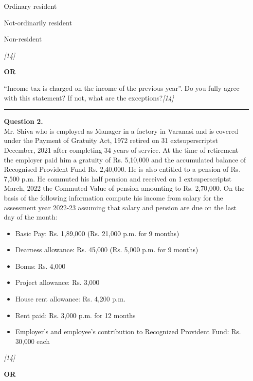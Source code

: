 \documentclass[11pt,a4paper]{article}
\newcommand{\pts}[1]{\hfill   \textit{[#1]}}
\begin{document}
\begin{parts}
  \item Ordinary resident
  \item Not-ordinarily resident
  \item Non-resident
\end{parts}\pts{14}

\centerline{   \textbf{OR}}




\noindent ``Income tax is charged on the income of the previous year''. Do you fully agree with this statement? If not, what are the exceptions?\pts{14}

\medskip\rule{\linewidth}{0.2pt}




\noindent   \textbf{Question 2.} \\
Mr. Shiva who is employed as Manager in a factory in Varanasi and is covered under the Payment of Gratuity Act, 1972 retired on 31 extsuperscript{st} December, 2021 after completing 34 years of service. At the time of retirement the employer paid him a gratuity of Rs. 5,10,000 and the accumulated balance of Recognised Provident Fund Rs. 2,40,000. He is also entitled to a pension of Rs. 7,500 p.m. He commuted his half pension and received on 1 extsuperscript{st} March, 2022 the Commuted Value of pension amounting to Rs. 2,70,000. On the basis of the following information compute his income from salary for the assessment year 2022-23 assuming that salary and pension are due on the last day of the month:

\begin{itemize}[leftmargin=*]
  \item Basic Pay: Rs. 1,89,000 (Rs. 21,000 p.m. for 9 months)
  \item Dearness allowance: Rs. 45,000 (Rs. 5,000 p.m. for 9 months)
  \item Bonus: Rs. 4,000
  \item Project allowance: Rs. 3,000
  \item House rent allowance: Rs. 4,200 p.m.
  \item Rent paid: Rs. 3,000 p.m. for 12 months
  \item Employer's and employee's contribution to Recognized Provident Fund: Rs. 30,000 each
\end{itemize}\pts{14}

\centerline{   \textbf{OR}}
\end{document}
